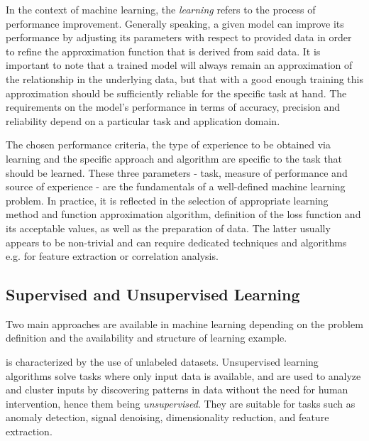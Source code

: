 In the context of machine learning, the \textit{learning} refers to the process of performance improvement.
Generally speaking, a given model can improve its performance by adjusting its parameters with respect to provided data in order to refine the approximation function that is derived from said data. 
It is important to note that a trained model will always remain an approximation of the relationship in the underlying data, but that with a good enough training this approximation should be sufficiently reliable for the specific task at hand.
The requirements on the model's performance in terms of accuracy, precision and reliability depend on a particular task and application domain.

The chosen performance criteria, the type of experience to be obtained via learning and the specific approach and algorithm are specific to the task that should be learned.
These three parameters - task, measure of performance and source of experience - are the fundamentals of a well-defined machine learning problem.
In practice, it is reflected in the selection of appropriate learning method and function approximation algorithm, definition of the loss function and its acceptable values, as well as the preparation of data.
The latter usually appears to be non-trivial and can require dedicated techniques and algorithms e.g. for feature extraction or correlation analysis.

\subsection{Supervised and Unsupervised Learning}

Two main approaches are available in machine learning depending on the problem definition and the availability and structure of learning example.

 is characterized by the use of unlabeled datasets.
Unsupervised learning algorithms solve tasks where only input data is available, and are used to analyze and cluster inputs by discovering patterns in data without the need for human intervention, hence them being \textit{unsupervised}.
They are suitable for tasks such as anomaly detection, signal denoising, dimensionality reduction, and feature extraction.

